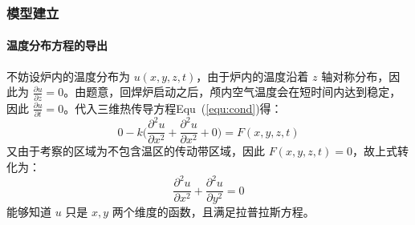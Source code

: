 \documentclass[../main.tex]{subfiles}
\begin{document}
\subsubsection{模型建立}
% 
% 

\paragraph{温度分布方程的导出}
不妨设炉内的温度分布为 \(u ( x,  y  ,z ,t)\)，由于炉内的温度沿着 \(z\) 轴对称分布，因此为 \(\frac{\partial u}{ \partial z} = 0\)。由题意，回焊炉启动之后，颅内空气温度会在短时间内达到稳定，因此 \( \frac{\partial u}{ \partial t} = 0\)。代入三维热传导方程Equ~(\ref{equ:cond})得：
\begin{equation}
0 - k \bigg( \frac{\partial ^{2} u }{\partial x ^{2}} + \frac{\partial ^{2} u}{\partial x ^{2}} + 0\bigg) = F (x , y, z , t)
\end{equation}
又由于考察的区域为不包含温区的传动带区域，因此 \(F (x, y , z , t) = 0\)，故上式转化为：
\begin{equation}
\frac{\partial ^{2} u}{\partial x ^{2}} + \frac{\partial ^{2} u}{\partial y ^{2}} = 0
\end{equation}
能够知道 \(u\) 只是 \(x , y\) 两个维度的函数，且满足拉普拉斯方程。
\end{document}
